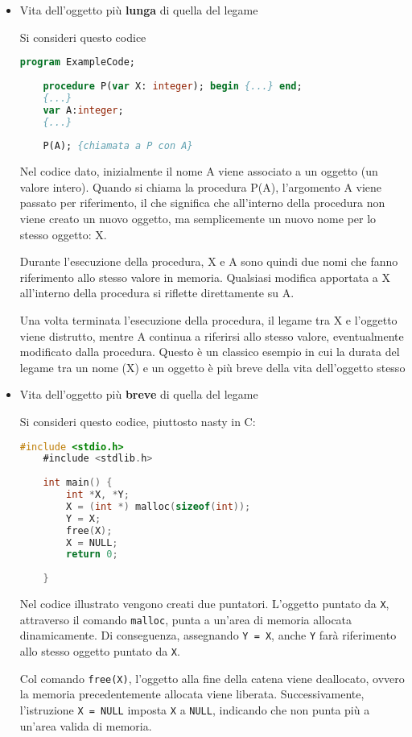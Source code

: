 \begin{itemize}
  \item Vita dell’oggetto più \textbf{lunga} di quella del legame
  
  Si consideri questo codice
  
  \begin{lstlisting}[language=Pascal]
    program ExampleCode;
    
    procedure P(var X: integer); begin {...} end;
    {...}
    var A:integer;
    {...}
      
    P(A); {chiamata a P con A}
  \end{lstlisting}
  Nel codice dato, inizialmente il nome A viene associato a un oggetto (un valore intero). Quando si chiama la procedura P(A), l'argomento A viene passato per riferimento, il che significa che all'interno della procedura non viene creato un nuovo oggetto, ma semplicemente un nuovo nome per lo stesso oggetto: X.

  Durante l'esecuzione della procedura, X e A sono quindi due nomi che fanno riferimento allo stesso valore in memoria. Qualsiasi modifica apportata a X all'interno della procedura si riflette direttamente su A.

  Una volta terminata l'esecuzione della procedura, il legame tra X e l'oggetto viene distrutto, mentre A continua a riferirsi allo stesso valore, eventualmente modificato dalla procedura. Questo è un classico esempio in cui la durata del legame tra un nome (X) e un oggetto è più breve della vita dell'oggetto stesso
  \item Vita dell’oggetto più \textbf{breve} di quella del legame
  
  Si consideri questo codice, piuttosto nasty in C:
  \begin{lstlisting}[language=C]
    #include <stdio.h>
    #include <stdlib.h>
    
    int main() {
        int *X, *Y;
        X = (int *) malloc(sizeof(int));
        Y = X;
        free(X);
        X = NULL;
        return 0;
    
    }
  \end{lstlisting}
  
  Nel codice illustrato vengono creati due puntatori. L'oggetto puntato da \texttt{X},  
  attraverso il comando \texttt{malloc}, punta a un'area di memoria allocata dinamicamente.  
  Di conseguenza, assegnando \texttt{Y = X}, anche \texttt{Y} farà riferimento  
  allo stesso oggetto puntato da \texttt{X}.  

  Col comando \texttt{free(X)}, l'oggetto alla fine della catena viene deallocato,  
  ovvero la memoria precedentemente allocata viene liberata.  
  Successivamente, l'istruzione \texttt{X = NULL} imposta \texttt{X} a \texttt{NULL},  
  indicando che non punta più a un'area valida di memoria.  


\end{itemize}

